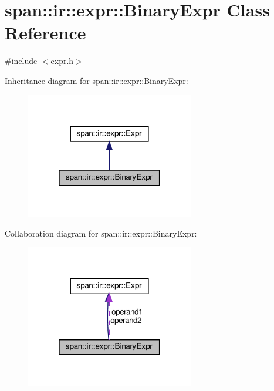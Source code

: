 \hypertarget{classspan_1_1ir_1_1expr_1_1BinaryExpr}{}\section{span\+:\+:ir\+:\+:expr\+:\+:Binary\+Expr Class Reference}
\label{classspan_1_1ir_1_1expr_1_1BinaryExpr}


{\ttfamily \#include $<$expr.\+h$>$}



Inheritance diagram for span\+:\+:ir\+:\+:expr\+:\+:Binary\+Expr\+:\nopagebreak
\begin{figure}[H]
\begin{center}
\leavevmode
\includegraphics[width=208pt]{classspan_1_1ir_1_1expr_1_1BinaryExpr__inherit__graph}
\end{center}
\end{figure}


Collaboration diagram for span\+:\+:ir\+:\+:expr\+:\+:Binary\+Expr\+:\nopagebreak
\begin{figure}[H]
\begin{center}
\leavevmode
\includegraphics[width=208pt]{classspan_1_1ir_1_1expr_1_1BinaryExpr__coll__graph}
\end{center}
\end{figure}
